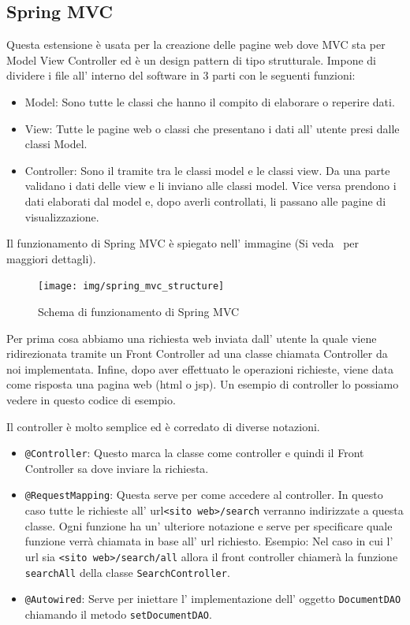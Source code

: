 \documentclass[12pt]{book}
\begin{document}
\subsection{Spring MVC}
Questa estensione è usata per la creazione delle pagine web dove MVC sta per 
Model View Controller ed è un design pattern di tipo strutturale.
Impone di dividere i file all' interno del software in 3 parti con le seguenti 
funzioni:
\begin{itemize}
    \item Model: Sono tutte le classi che hanno 
        il compito di elaborare o reperire dati.
    \item View: Tutte le pagine web o classi che presentano
        i dati all' utente presi dalle classi Model.
    \item Controller: Sono il tramite tra le classi model e le classi
        view. Da una parte validano i dati delle view e li inviano alle 
        classi model. Vice versa prendono i dati elaborati dal model e, dopo 
        averli controllati, li passano alle pagine di visualizzazione.
\end{itemize}
Il funzionamento di Spring MVC è spiegato nell' immagine 
(Si veda~\cite{apress:introducing_spring_framework} per maggiori dettagli).
\begin{figure}[H]
    \centering
    \texttt{[image: img/spring\_mvc\_structure]}
    \caption{Schema di funzionamento di Spring MVC}\label{spring:diagram}
\end{figure}
Per prima cosa abbiamo una richiesta web inviata dall' utente la quale viene 
ridirezionata tramite un Front Controller ad una classe chiamata Controller da 
noi implementata.
Infine, dopo aver effettuato le operazioni richieste, viene data come risposta 
una pagina web (html o jsp).
Un esempio di controller lo possiamo vedere in questo codice di esempio.

Il controller è molto semplice ed è corredato di diverse notazioni.
\begin{itemize}
    \item \texttt{@Controller}: Questo marca la classe come controller e quindi
        il Front Controller sa dove inviare la richiesta.
    \item \texttt{@RequestMapping}: Questa serve per come accedere al controller.
        In questo caso tutte le richieste all' url\texttt{<sito web>/search}
        verranno indirizzate a questa classe.
        Ogni funzione ha un' ulteriore notazione e serve per specificare quale
        funzione verrà chiamata in base all' url richiesto.
        Esempio: Nel caso in cui l' url sia \texttt{<sito web>/search/all} 
        allora il front controller chiamerà la funzione \texttt{searchAll}
        della classe \texttt{SearchController}.
    \item \texttt{@Autowired}: Serve per iniettare l' implementazione dell' 
        oggetto \texttt{DocumentDAO} chiamando il metodo 
        \texttt{setDocumentDAO}\@.
\end{itemize}
\end{document}
